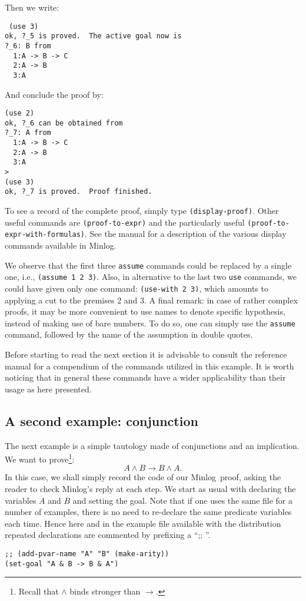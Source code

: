 \documentclass[12pt]{amsart}
\newcommand{\inquotes}[1]{``#1''}
\newcommand{\mi}{Minlog}
\newcommand{\ob}{\to}
\begin{document}
Then we write:
\begin{verbatim} (use 3)
ok, ?_5 is proved.  The active goal now is
?_6: B from
  1:A -> B -> C
  2:A -> B
  3:A
\end{verbatim}

And conclude the proof by:
\begin{verbatim}
(use 2)
ok, ?_6 can be obtained from
?_7: A from
  1:A -> B -> C
  2:A -> B
  3:A
>
(use 3)
ok, ?_7 is proved.  Proof finished.
\end{verbatim}

To see a record of the complete proof, simply type
\texttt{(display-proof)}.  Other useful commands are
\texttt{(proof-to-expr)} and the particularly useful
\texttt{(proof-to-expr-with-formulas)}.  See the manual for a
description of the various display commands available in \mi.

We observe that the first three \texttt{assume} commands could be
replaced by a single one, i.e., \texttt{(assume 1 2 3)}.  Also, in
alternative to the last two \texttt{use} commands, we could have given
only one command: \texttt{(use-with 2 3)}, which amounts to applying a
cut to the premises 2 and 3.  A final remark: in case of rather
complex proofs, it may be more convenient to use names to denote
specific hypothesis, instead of making use of bare numbers.  To do so,
one can simply use the \texttt{assume} command, followed by the name
of the assumption in double quotes.

Before starting to read the next section it is advisable to consult
the reference manual \cite{minlogman} for a compendium of the commands
utilized in this example.  It is worth noticing that in general these
commands have a wider applicability than their usage as here
presented.


\subsection{A second example: conjunction}
The next example is a simple tautology made of conjunctions and an
implication.  We want to prove\footnote{Recall that $\land$ binds
  stronger than $\ob$.}:
\begin{equation*}
  A \land B \ob B \land A.
\end{equation*}
In this case, we shall simply record the code of our \mi\ proof,
asking the reader to check \mi's reply at each step.  We start as
usual with declaring the variables $A$ and $B$ and setting the goal.
Note that if one uses the same file for a number of examples, there is
no need to re-declare the same predicate variables each time.  Hence
here and in the example file available with the distribution repeated
declarations are commented by prefixing a \inquotes{;; }.
\begin{verbatim}
;; (add-pvar-name "A" "B" (make-arity))
(set-goal "A & B -> B & A")
\end{verbatim}
\end{document}
